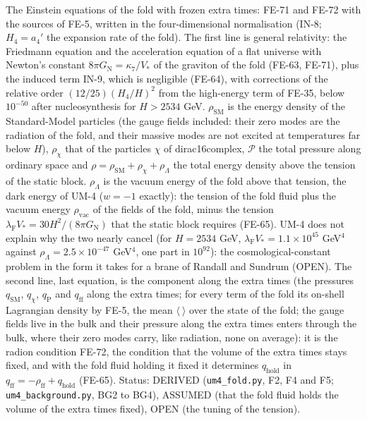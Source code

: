 \documentclass[
  10pt,
]{article}
\begin{document}
The Einstein equations of the fold with frozen extra times: FE-71 and
FE-72 with the sources of FE-5, written in the four-dimensional
normalisation (IN-8; \(H_4 = a_4'\) the expansion rate of the fold). The
first line is general relativity: the Friedmann equation and the
acceleration equation of a flat universe with Newton's constant
\(8\pi G_{\mathrm{N}} = \kappa_7/V_*\) of the graviton of the fold
(FE-63, FE-71), plus the induced term IN-9, which is negligible (FE-64),
with corrections of the relative order \((12/25)(H_4/H)^2\) from the
high-energy term of FE-35, below \(10^{-50}\) after nucleosynthesis for
\(H > 2534\) GeV. \(\rho_{\mathrm{SM}}\) is the energy density of the
Standard-Model particles (the gauge fields included: their zero modes
are the radiation of the fold, and their massive modes are not excited
at temperatures far below \(H\)), \(\rho_\chi\) that of the particles
\(\chi\) of dirac16complex, \(\mathcal{P}\) the total pressure along
ordinary space and
\(\rho = \rho_{\mathrm{SM}} + \rho_\chi + \rho_\Lambda\) the total
energy density above the tension of the static block. \(\rho_\Lambda\)
is the vacuum energy of the fold above that tension, the dark energy of
UM-4 (\(w = -1\) exactly): the tension of the fold fluid plus the vacuum
energy \(\rho_{\mathrm{vac}}\) of the fields of the fold, minus the
tension \(\lambda_{\mathrm{F}}V_* = 30H^2/(8\pi G_{\mathrm{N}})\) that
the static block requires (FE-65). UM-4 does not explain why the two
nearly cancel (for \(H = 2534\) GeV,
\(\lambda_{\mathrm{F}}V_* = 1.1\times10^{45}\) GeV\(^4\) against
\(\rho_\Lambda = 2.5\times10^{-47}\) GeV\(^4\), one part in
\(10^{92}\)): the cosmological-constant problem in the form it takes for
a brane of Randall and Sundrum (OPEN). The second line, last equation,
is the component along the extra times (the pressures
\(q_{\mathrm{SM}}\), \(q_\chi\), \(q_{\mathrm{P}}\) and
\(q_{\mathrm{ff}}\) along the extra times; for every term of the fold
its on-shell Lagrangian density by FE-5, the mean \(\langle\ \rangle\)
over the state of the fold; the gauge fields live in the bulk and their
pressure along the extra times enters through the bulk, where their zero
modes carry, like radiation, none on average): it is the radion
condition FE-72, the condition that the volume of the extra times stays
fixed, and with the fold fluid holding it fixed it determines
\(q_{\mathrm{hold}}\) in
\(q_{\mathrm{ff}} = -\rho_{\mathrm{ff}} + q_{\mathrm{hold}}\) (FE-65).
Status: DERIVED (\texttt{um4\_fold.py}, F2, F4 and F5;
\texttt{um4\_background.py}, BG2 to BG4), ASSUMED (that the fold fluid
holds the volume of the extra times fixed), OPEN (the tuning of the
tension).
\end{document}
